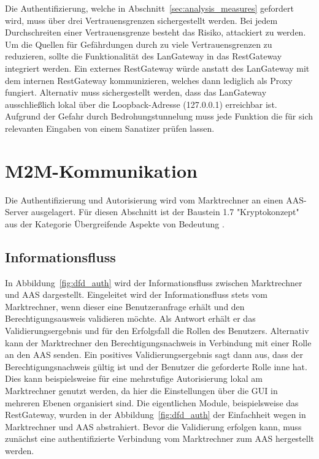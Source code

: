 \documentclass[11pt,a4paper]{report}
\begin{document}
Die Authentifizierung, welche in Abschnitt~\ref{sec:analysis_measures} gefordert wird, muss über drei Vertrauensgrenzen sichergestellt werden. Bei jedem Durchschreiten einer Vertrauensgrenze besteht das Risiko, attackiert zu werden. Um die Quellen für Gefährdungen durch zu viele Vertrauensgrenzen zu reduzieren, sollte die Funktionalität des LanGateway in das RestGateway integriert werden. Ein externes RestGateway würde anstatt des LanGateway mit dem internen RestGateway kommunizieren, welches dann lediglich als Proxy fungiert. Alternativ muss sichergestellt werden, dass das LanGateway ausschließlich lokal über die Loopback-Adresse (127.0.0.1) erreichbar ist. Aufgrund der Gefahr durch Bedrohungstunnelung muss jede Funktion die für sich relevanten Eingaben von einem Sanatizer prüfen lassen.

\section{M2M-Kommunikation} \label{sec:model_auth}

Die Authentifizierung und Autorisierung wird vom Marktrechner an einen AAS-Server ausgelagert. Für diesen Abschnitt ist der Baustein 1.7 "Kryptokonzept" aus der Kategorie Übergreifende Aspekte von Bedeutung \cite{bsi_b1017}.

\subsection{Informationsfluss}

In Abbildung~\ref{fig:dfd_auth} wird der Informationsfluss zwischen Marktrechner und AAS dargestellt. Eingeleitet wird der Informationsfluss stets vom Marktrechner, wenn dieser eine Benutzeranfrage erhält und den Berechtigungsausweis validieren möchte. Als Antwort erhält er das Validierungsergebnis und für den Erfolgsfall die Rollen des Benutzers. Alternativ kann der Marktrechner den Berechtigungsnachweis in Verbindung mit einer Rolle an den AAS senden. Ein positives Validierungsergebnis sagt dann aus, dass der Berechtigungsnachweis gültig ist und der Benutzer die geforderte Rolle inne hat. Dies kann beispielsweise für eine mehrstufige Autorisierung lokal am Marktrechner genutzt werden, da hier die Einstellungen über die GUI in mehreren Ebenen organisiert sind. Die eigentlichen Module, beispielsweise das RestGateway, wurden in der Abbildung~\ref{fig:dfd_auth} der Einfachheit wegen in Marktrechner und AAS abstrahiert. Bevor die Validierung erfolgen kann, muss zunächst eine authentifizierte Verbindung vom Marktrechner zum AAS hergestellt werden.
\end{document}
